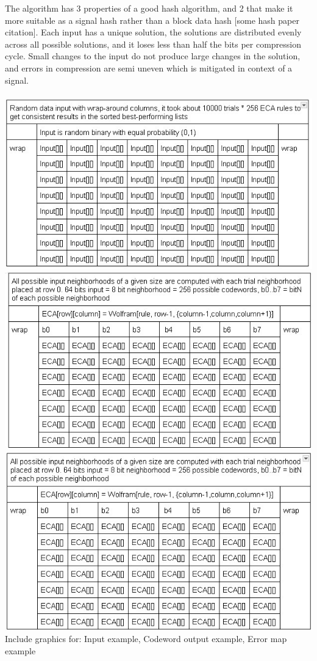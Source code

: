 \documentclass[11pt]{article}
\begin{document}
The algorithm has 3 properties of a good hash algorithm, and 2 that make it more suitable as a
signal hash rather than a block data hash [some hash paper citation]. Each input has a unique
solution, the solutions are distributed evenly across all possible solutions, and it loses less
than half the bits per compression cycle. Small changes to the input do not produce large changes
in the solution, and errors in compression are semi uneven which is mitigated in context of a signal.
\\
\\
\includegraphics{WrappedInput}\\
\includegraphics{ECAspace}\\
\includegraphics{ErrorScore}\\
Include graphics for: Input example, Codeword output example, Error map example
\\
\end{document}
